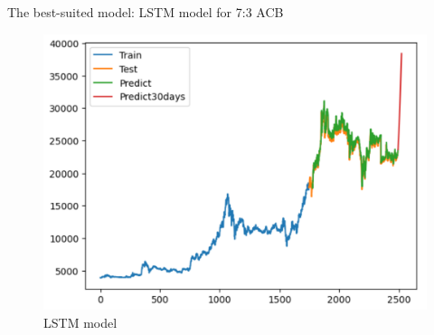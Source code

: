 \documentclass{ieeeojies}
\begin{document}
The best-suited model: LSTM model for 7:3 ACB
\begin{figure}[H]
    \centering
    \includegraphics[width=1\linewidth]{acb_lstm_73.png}
    \caption{LSTM model}
    \label{fig:enter-label}
\end{figure}
\end{document}
